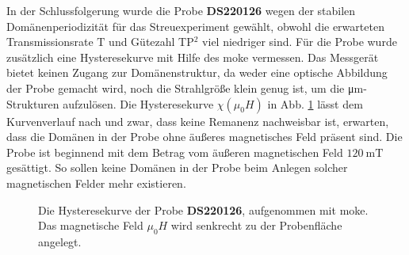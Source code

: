 \noindent
In der Schlussfolgerung wurde die Probe \textbf{DS220126} wegen der stabilen Domänenperiodizität für das Streuexperiment gewählt, obwohl die erwarteten Transmissionsrate $\text{T}$ und Gütezahl TP$^2$ viel niedriger sind. Für die Probe wurde zusätzlich eine Hysteresekurve mit Hilfe des \gls{moke} vermessen. Das Messgerät bietet keinen Zugang zur Domänenstruktur, da weder eine optische Abbildung der Probe gemacht wird, noch die Strahlgröße klein genug ist, um die \si{\micro\meter}-Strukturen aufzulösen. Die Hysteresekurve $\chi(\mu_0 H)$ in Abb. \ref{fig:hysterese_sample} lässt dem Kurvenverlauf nach und zwar, dass keine Remanenz nachweisbar ist,   erwarten, dass die Domänen in der Probe ohne äußeres magnetisches Feld präsent sind. Die Probe ist beginnend mit dem Betrag vom äußeren magnetischen Feld $\SI{120}{\milli\tesla}$ gesättigt. So sollen keine Domänen in der Probe beim Anlegen solcher magnetischen Felder mehr existieren.
\begin{figure}[H]
    \centering
    
    \caption{Die Hysteresekurve der Probe \textbf{DS220126}, aufgenommen mit \gls{moke}. Das magnetische Feld $\mu_0 H$ wird senkrecht zu der Probenfläche angelegt.}
    \label{fig:hysterese_sample}
\end{figure}
\newpage